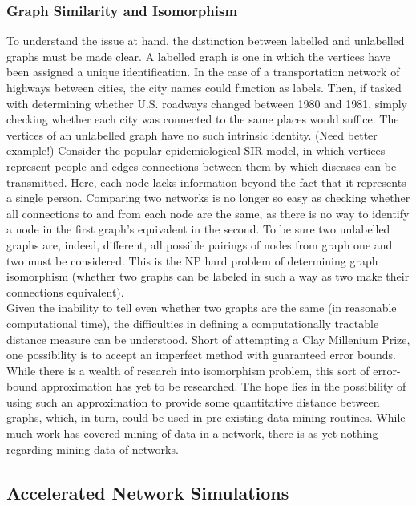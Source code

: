\documentclass[11pt]{article}
\begin{document}
\subsubsection{Graph Similarity and Isomorphism}
To understand the issue at hand, the distinction between labelled and unlabelled graphs must be made clear. A labelled graph is one in which the vertices have been assigned a unique identification. In the case of a transportation network of highways between cities, the city names could function as labels. Then, if tasked with determining whether U.S. roadways changed between 1980 and 1981, simply checking whether each city was connected to the same places would suffice. The vertices of an unlabelled graph have no such intrinsic identity. (Need better example!) Consider the popular epidemiological SIR model, in which vertices represent people and edges connections between them by which diseases can be transmitted. Here, each node lacks information beyond the fact that it represents a single person. Comparing two networks is no longer so easy as checking whether all connections to and from each node are the same, as there is no way to identify a node in the first graph's equivalent in the second. To be sure two unlabelled graphs are, indeed, different, all possible pairings of nodes from graph one and two must be considered. This is the NP hard problem of determining graph isomorphism (whether two graphs can be labeled in such a way as two make their connections equivalent).\vspace{1mm}\\
Given the inability to tell even whether two graphs are the same (in reasonable computational time), the difficulties in defining a computationally tractable distance measure can be understood. Short of attempting a Clay Millenium Prize, one possibility is to accept an imperfect method with guaranteed error bounds. While there is a wealth of research into isomorphism problem, this sort of error-bound approximation has yet to be researched. The hope lies in the possibility of using such an approximation to provide some quantitative distance between graphs, which, in turn, could be used in pre-existing data mining routines. While much work has covered mining of data in a network, there is as yet nothing regarding mining data of networks. 
\subsection{Accelerated Network Simulations}
\end{document}
